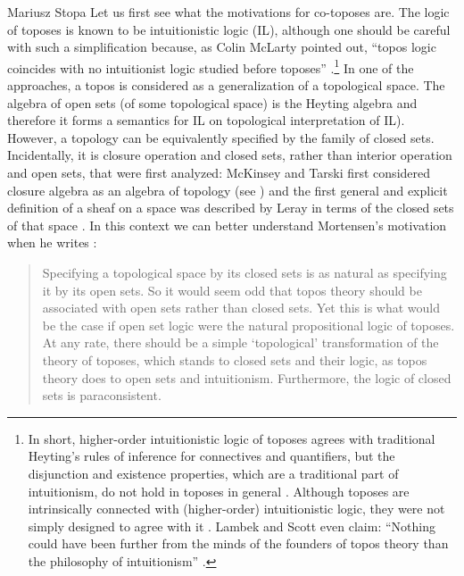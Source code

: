 \begin{artengenv}{Mariusz Stopa}
Let us first see what the motivations for co-toposes are. The logic of toposes is known to be intuitionistic logic (\textsf{IL}), although one should be careful with such a simplification because, as Colin McLarty pointed out, ``topos logic coincides with no intuitionist logic studied before toposes''  \parencite[see][p.vii]{mclarty-1995}.\footnote{In short, higher-order intuitionistic logic of toposes agrees with traditional Heyting's rules of inference for connectives and quantifiers, but the disjunction and existence properties, which are a traditional part of intuitionism, do not hold in toposes in general \parencite[see][p.154]{mclarty_book_1990}. Although toposes are intrinsically connected with (higher-order) intuitionistic logic, they were not simply designed to agree with it \parencite[see][p.152f]{mclarty_book_1990}.
Lambek and Scott even claim: ``Nothing could have been further from the minds of the founders of topos theory than the philosophy of intuitionism'' \parencite[see][p.125]{lambek-scott}.} In one of the approaches, a topos is considered as a generalization of a topological space. The algebra of open sets (of some topological space) is the Heyting algebra and therefore it forms a semantics for \textsf{IL} \parencite[cf.][]{stone-1937, tarski-1938} on topological interpretation of \textsf{IL}). However, a topology can be equivalently specified by the family of closed sets. Incidentally, it is closure operation and closed sets, rather than interior operation and open sets, that were first analyzed: McKinsey and Tarski first considered closure algebra as an algebra of topology (see \parencite{mckinsey-tarski-1944, mckinsey-tarski-1946}) and the first general and explicit definition of a sheaf on a space was described by Leray in terms of the closed sets of that space  \parencite[cf.][p.1]{maclane-moerdijk-1994}. In this context we can better understand Mortensen's motivation when he writes \parencite[see][p.102]{mortensen-1995}:
\begin{quote}
\begin{small}
	Specifying a topological space by its closed sets is as natural as specifying it by its open sets. So it would seem odd that topos theory should be associated with open sets rather than closed sets. Yet this is what would be the case if open set logic were the natural propositional logic of toposes. At any rate, there should be a simple ‘topological’ transformation of the theory of toposes, which stands to closed sets and their logic, as topos theory does to open sets and intuitionism. Furthermore, the logic of closed sets is paraconsistent.
\end{small}
\end{quote}


\end{artengenv}
